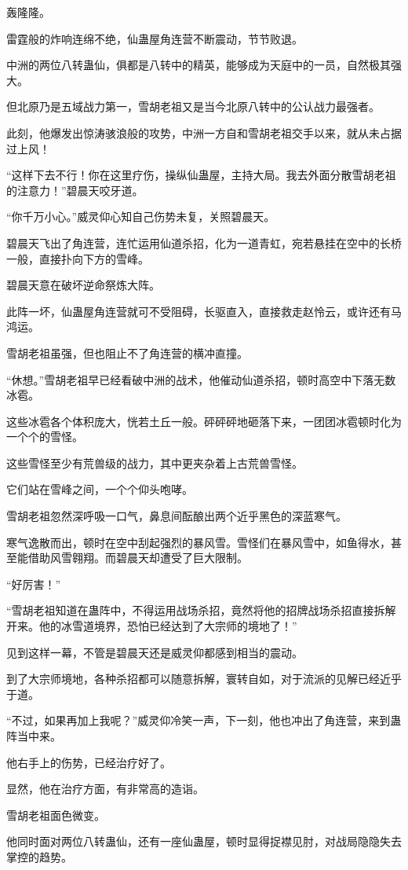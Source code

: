 \begin{this_body}
轰隆隆。

雷霆般的炸响连绵不绝，仙蛊屋角连营不断震动，节节败退。

中洲的两位八转蛊仙，俱都是八转中的精英，能够成为天庭中的一员，自然极其强大。

但北原乃是五域战力第一，雪胡老祖又是当今北原八转中的公认战力最强者。

此刻，他爆发出惊涛骇浪般的攻势，中洲一方自和雪胡老祖交手以来，就从未占据过上风！

“这样下去不行！你在这里疗伤，操纵仙蛊屋，主持大局。我去外面分散雪胡老祖的注意力！”碧晨天咬牙道。

“你千万小心。”威灵仰心知自己伤势未复，关照碧晨天。

碧晨天飞出了角连营，连忙运用仙道杀招，化为一道青虹，宛若悬挂在空中的长桥一般，直接扑向下方的雪峰。

碧晨天意在破坏逆命祭炼大阵。

此阵一坏，仙蛊屋角连营就可不受阻碍，长驱直入，直接救走赵怜云，或许还有马鸿运。

雪胡老祖虽强，但也阻止不了角连营的横冲直撞。

“休想。”雪胡老祖早已经看破中洲的战术，他催动仙道杀招，顿时高空中下落无数冰雹。

这些冰雹各个体积庞大，恍若土丘一般。砰砰砰地砸落下来，一团团冰雹顿时化为一个个的雪怪。

这些雪怪至少有荒兽级的战力，其中更夹杂着上古荒兽雪怪。

它们站在雪峰之间，一个个仰头咆哮。

雪胡老祖忽然深呼吸一口气，鼻息间酝酿出两个近乎黑色的深蓝寒气。

寒气逸散而出，顿时在空中刮起强烈的暴风雪。雪怪们在暴风雪中，如鱼得水，甚至能借助风雪翱翔。而碧晨天却遭受了巨大限制。

“好厉害！”

“雪胡老祖知道在蛊阵中，不得运用战场杀招，竟然将他的招牌战场杀招直接拆解开来。他的冰雪道境界，恐怕已经达到了大宗师的境地了！”

见到这样一幕，不管是碧晨天还是威灵仰都感到相当的震动。

到了大宗师境地，各种杀招都可以随意拆解，寰转自如，对于流派的见解已经近乎于道。

“不过，如果再加上我呢？”威灵仰冷笑一声，下一刻，他也冲出了角连营，来到蛊阵当中来。

他右手上的伤势，已经治疗好了。

显然，他在治疗方面，有非常高的造诣。

雪胡老祖面色微变。

他同时面对两位八转蛊仙，还有一座仙蛊屋，顿时显得捉襟见肘，对战局隐隐失去掌控的趋势。


\end{this_body}
